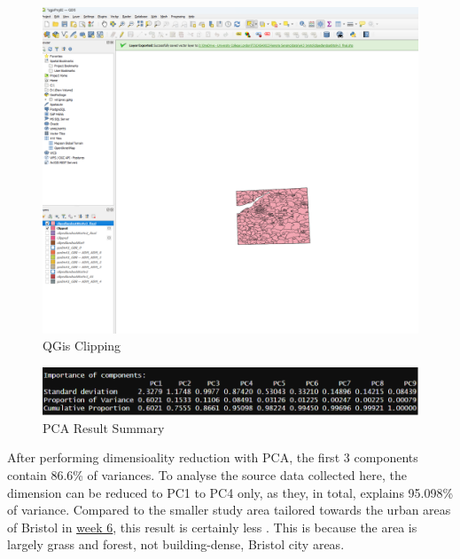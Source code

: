 \documentclass[
  letterpaper,
  DIV=11,
  numbers=noendperiod]{scrreprt}
\begin{document}
\begin{figure}

{\centering \includegraphics[width=4.80208in,height=\textheight]{images/wk3/Screenshot 2024-02-17 181559.png}

}

\caption{QGis Clipping}

\end{figure}

\begin{figure}

{\centering \includegraphics{images/wk3/wk3_pca_importance.png}

}

\caption{PCA Result Summary}

\end{figure}

After performing dimensioality reduction with PCA, the first 3
components contain 86.6\% of variances. To analyse the source data
collected here, the dimension can be reduced to PC1 to PC4 only, as
they, in total, explains 95.098\% of variance. Compared to the smaller
study area tailored towards the urban areas of Bristol in
\protect\hyperlink{week-6-introduction-to-google-earth-engine}{week 6},
this result is certainly less . This is because the area is largely
grass and forest, not building-dense, Bristol city areas.
\end{document}
